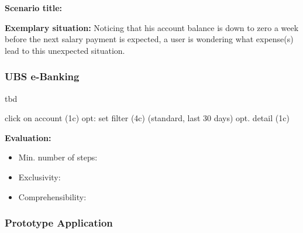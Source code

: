 \textbf{Scenario title:} \scenthree

\textbf{Exemplary situation:} Noticing that his account balance is down to zero a week before the next salary payment is expected, a user is wondering what expense(s) lead to this unexpected situation.



\subsubsection{UBS e-Banking}

tbd

click on account (1c)
opt: set filter (4c) (standard, last 30 days)
opt. detail (1c)

\textbf{Evaluation:} 
\begin{itemize}[noitemsep,nolistsep]
	\item Min. number of steps: \textbf{}
	\item Exclusivity: \textbf{}
	\item Comprehensibility: \textbf{}
\end{itemize}



\subsubsection{Prototype Application}

